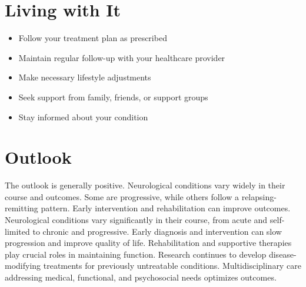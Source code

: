 \section{Living with It}
\begin{itemize}[noitemsep]
  \item Follow your treatment plan as prescribed
  \item Maintain regular follow-up with your healthcare provider
  \item Make necessary lifestyle adjustments
  \item Seek support from family, friends, or support groups
  \item Stay informed about your condition
\end{itemize}
\section{Outlook}
The outlook is generally positive. Neurological conditions vary widely in their course and outcomes. Some are progressive, while others follow a relapsing-remitting pattern. Early intervention and rehabilitation can improve outcomes. Neurological conditions vary significantly in their course, from acute and self-limited to chronic and progressive. Early diagnosis and intervention can slow progression and improve quality of life. Rehabilitation and supportive therapies play crucial roles in maintaining function. Research continues to develop disease-modifying treatments for previously untreatable conditions. Multidisciplinary care addressing medical, functional, and psychosocial needs optimizes outcomes.
